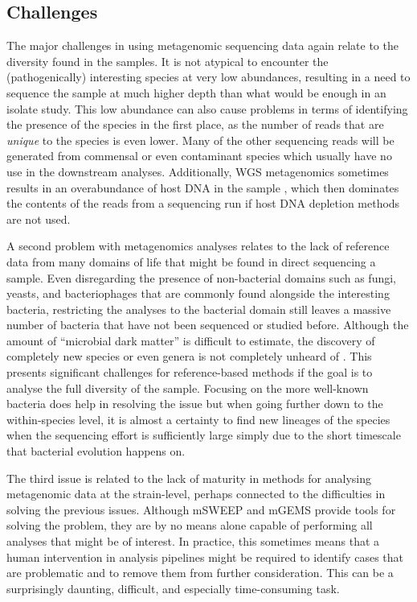 \documentclass[officiallayout]{tktla}
\begin{document}
\subsection{Challenges}
The major challenges in using metagenomic sequencing data again relate
to the diversity found in the samples. It is not atypical to encounter
the (pathogenically) interesting species at very low abundances,
resulting in a need to sequence the sample at much higher depth than
what would be enough in an isolate study. This low abundance can also
cause problems in terms of identifying the presence of the species in
the first place, as the number of reads that are \textit{unique} to
the species is even lower. Many of the other sequencing reads will be
generated from commensal or even contaminant species which usually
have no use in the downstream analyses. Additionally, WGS metagenomics
sometimes results in an overabundance of host DNA in the sample
\citep{pereira2019impact, mcardle2020sensitivity}, which then
dominates the contents of the reads from a sequencing run if host DNA
depletion methods are not used.

A second problem with metagenomics analyses relates to the lack of
reference data from many domains of life that might be found in direct
sequencing a sample. Even disregarding the presence of non-bacterial
domains such as fungi, yeasts, and bacteriophages that are commonly
found alongside the interesting bacteria, restricting the analyses to
the bacterial domain still leaves a massive number of bacteria that
have not been sequenced or studied before. Although the amount of
``microbial dark matter'' \citep{rinke2013insights} is difficult to
estimate, the discovery of completely new species
\citep{thorpe2021one} or even genera is not completely unheard of
\citep{conle2020studies, pitt2019aquirufa}. This presents significant
challenges for reference-based methods if the goal is to analyse the
full diversity of the sample. Focusing on the more well-known bacteria
does help in resolving the issue but when going further down to the
within-species level, it is almost a certainty to find new lineages of
the species when the sequencing effort is sufficiently large simply
due to the short timescale that bacterial evolution happens on.

The third issue is related to the lack of maturity in methods for
analysing metagenomic data at the strain-level, perhaps connected to
the difficulties in solving the previous issues. Although mSWEEP and
mGEMS provide tools for solving the problem, they are by no means
alone capable of performing all analyses that might be of interest. In
practice, this sometimes means that a human intervention in analysis
pipelines might be required to identify cases that are problematic and
to remove them from further consideration. This can be a surprisingly
daunting, difficult, and especially time-consuming task.
\end{document}
